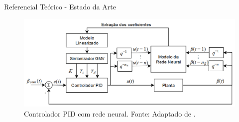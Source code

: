 \documentclass{beamer}
\begin{document}
\begin{frame}{Referencial Teórico - Estado da Arte}
    \begin{figure}[HT]
		\begin{center}
		\captionsetup{justification=centering}
        \includegraphics[scale=.42]{../referencial/img/pid_neural_chen_p212}
        \caption{Controlador PID com rede neural. \newline
        		 Fonte: Adaptado de .}
		\label{FIG_ADAPTATIVO}
        \end{center}
	\end{figure}
\end{frame}

\end{document}
